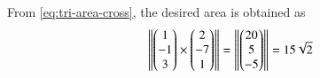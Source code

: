 			From \eqref{eq:tri-area-cross},
			the desired area is obtained as
\begin{align}
	\left\lVert\begin{pmatrix}1\\-1\\3\end{pmatrix} \times \begin{pmatrix}2\\ -7 \\ 1\end{pmatrix}\right\rVert
	=\left\lVert\begin{pmatrix}20\\5\\-5\end{pmatrix}\right\rVert
= 15\sqrt{2}
\end{align}

